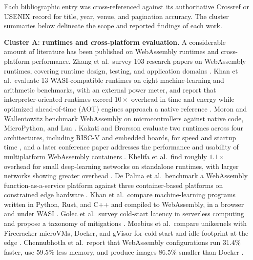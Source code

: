\documentclass{ws-jcsc}
\begin{document}
Each bibliographic entry was cross-referenced against its authoritative Crossref or USENIX record for title, year, venue, and pagination accuracy. The cluster summaries below delineate the scope and reported findings of each work.

\textbf{Cluster A: runtimes and cross-platform evaluation.} A considerable amount of literature has been published on WebAssembly runtimes and cross-platform performance. Zhang et al.\ survey 103 research papers on WebAssembly runtimes, covering runtime design, testing, and application domains \cite{zhang2025survey}. Khan et al.\ evaluate 13 WASI-compatible runtimes on eight machine-learning and arithmetic benchmarks, with an external power meter, and report that interpreter-oriented runtimes exceed $10\times$ overhead in time and energy while optimized ahead-of-time (AOT) engines approach a native reference \cite{khan2026taxonomy}. Moron and Wallentowitz benchmark WebAssembly on microcontrollers against native code, MicroPython, and Lua \cite{moron2025embedded}. Kakati and Brorsson evaluate two runtimes across four architectures, including RISC-V and embedded boards, for speed and startup time \cite{kakati2024cross}, and a later conference paper addresses the performance and usability of multiplatform WebAssembly containers \cite{kakati2025multiplatform}. Khelifa et al.\ find roughly $1.1\times$ overhead for small deep-learning networks on standalone runtimes, with larger networks showing greater overhead \cite{khelifa2024case}. De Palma et al.\ benchmark a WebAssembly function-as-a-service platform against three container-based platforms on constrained edge hardware \cite{depalma2024webassembly}. Khan et al.\ compare machine-learning programs written in Python, Rust, and C++ and compiled to WebAssembly, in a browser and under WASI \cite{khan2025ml}. Golec et al.\ survey cold-start latency in serverless computing and propose a taxonomy of mitigations \cite{golec2025cold}. Moebius et al.\ compare unikernels with Firecracker microVMs, Docker, and gVisor for cold start and idle footprint at the edge \cite{moebius2024unikernels}. Chennubhotla et al.\ report that WebAssembly configurations run 31.4\% faster, use 59.5\% less memory, and produce images 86.5\% smaller than Docker \cite{chennubhotla2025docker}.
\end{document}
